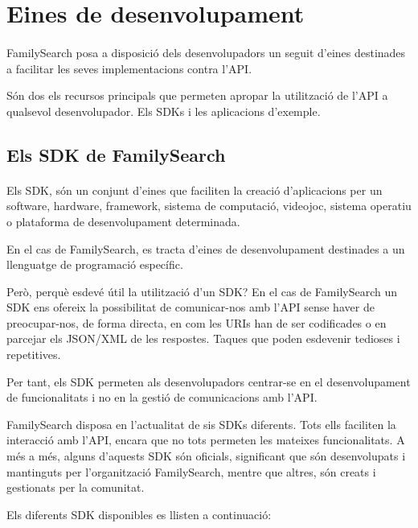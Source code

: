 \section{Eines de desenvolupament}

    \paragraph{}
    FamilySearch posa a disposició dels desenvolupadors un seguit d'eines destinades a facilitar les seves implementacions contra l'API.

    Són dos els recursos principals que permeten apropar la utilització de l'API a qualsevol desenvolupador. Els SDKs i les aplicacions d'exemple.

    \subsection{Els SDK de FamilySearch}

        \paragraph{}
        Els \gls{SDK}, són un conjunt d'eines que faciliten la creació d'aplicacions per un software, hardware, framework, sistema de computació, videojoc, sistema operatiu o plataforma de desenvolupament determinada.

        En el cas de FamilySearch, es tracta d'eines de desenvolupament destinades a un llenguatge de programació específic.

        Però, perquè esdevé útil la utilització d'un SDK? En el cas de FamilySearch un SDK ens ofereix la possibilitat de comunicar-nos amb l'API sense haver de preocupar-nos, de forma directa, en com les URIs han de ser codificades o en parcejar els JSON/XML de les respostes. Taques que poden esdevenir tedioses i repetitives.

        Per tant, els SDK permeten als desenvolupadors centrar-se en el desenvolupament de funcionalitats i no en la gestió de comunicacions amb l'API.

        FamilySearch disposa en l'actualitat de sis SDKs diferents. Tots ells faciliten la interacció amb l'API, encara que no tots permeten les mateixes funcionalitats. A més a més, alguns d'aquests SDK són oficials, significant que són desenvolupats i mantinguts per l'organització FamilySearch, mentre que altres, són creats i gestionats per la comunitat.

        Els diferents SDK disponibles es llisten a continuació:

